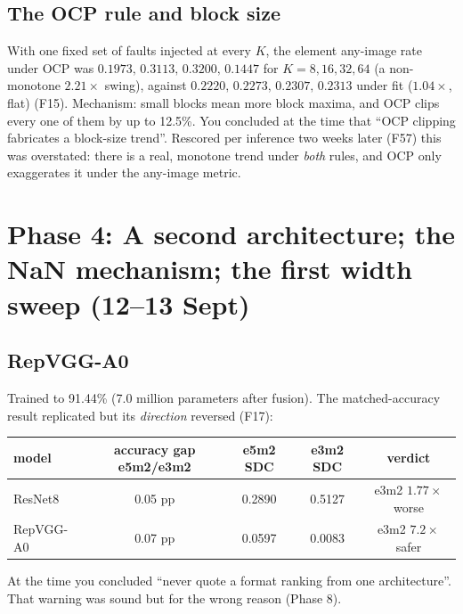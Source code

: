 \subsection{The OCP rule and block size}
With one fixed set of faults injected at every $K$, the element any-image rate under OCP was $0.1973,\,0.3113,\,0.3200,\,0.1447$ for $K=8,16,32,64$ (a non-monotone $2.21\times$ swing), against $0.2220,\,0.2273,\,0.2307,\,0.2313$ under fit ($1.04\times$, flat) (F15).
Mechanism: small blocks mean more block maxima, and OCP clips every one of them by up to 12.5\%. You concluded at the time that ``OCP clipping fabricates a block-size trend''. Rescored per inference two weeks later (F57) this was overstated: there is a real, monotone trend under \emph{both} rules, and OCP only exaggerates it under the any-image metric.

\section{Phase 4: A second architecture; the NaN mechanism; the first width sweep (12--13 Sept)}

\subsection{RepVGG-A0}
Trained to 91.44\% (7.0 million parameters after fusion). The matched-accuracy result replicated but its \emph{direction} reversed (F17):
\begin{center}
\small
\begin{tabular}{lcccc}
\toprule
model & accuracy gap e5m2/e3m2 & e5m2 SDC & e3m2 SDC & verdict \\
\midrule
ResNet8 & 0.05 pp & 0.2890 & 0.5127 & e3m2 $1.77\times$ worse \\
RepVGG-A0 & 0.07 pp & 0.0597 & 0.0083 & e3m2 $7.2\times$ safer \\
\bottomrule
\end{tabular}
\end{center}
At the time you concluded ``never quote a format ranking from one architecture''. That warning was sound but for the wrong reason (Phase 8).

